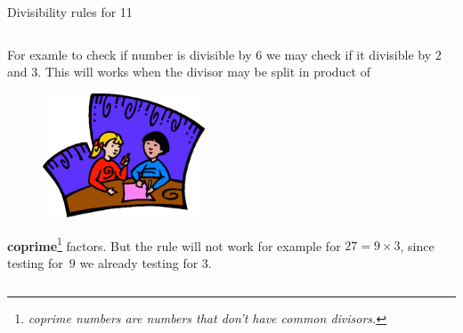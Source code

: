 \documentclass[9pt,aspectratio=169]{beamer}
\begin{document}
\begin{frame}{Divisibility rules for 11}
\begin{columns}[T]
\begin{column}{0.5\textwidth}
      For examle to check if number is divisible by $6$ we may check if it divisible by $2$ and $3$. This will works when the divisor may be split in product of 
      \begin{figure}
        \vspace*{-0.8em}
        \includegraphics[width=0.43\textwidth]{01 - Modular arithmetic/collab.png}
      \end{figure}
      \textbf{coprime}\footnote{\emph{coprime numbers are numbers that don't have common divisors.}} factors. 
      But the rule will not work for example for $27 = 9 \times 3$, since testing for~$9$ we already testing for $3$.
      \vspace*{1.7em}
    \end{column}
  \end{columns}
\end{frame}
\end{document}
